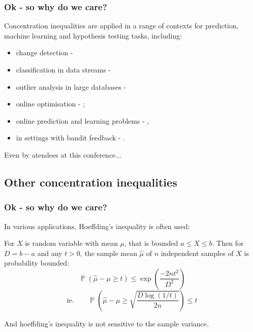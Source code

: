 \documentclass{beamer}
\DeclareMathOperator{\p}{\mathbb{P}}
\begin{document}
\begin{frame}
\frametitle{Ok - so why do we care?}
Concentration inequalities are applied in a range of contexts for prediction, machine learning and hypothesis testing tasks, including:\\

\begin{itemize}
\item change detection - \cite{KiferShaiGehrke2004,8000571}
\item classification in data streams - \cite{Zia-UrRehman2012}
\item outlier analysis in large databases - \cite{Aggarwal2015}
\item online optimisation - \cite{FlaxmanKalaiMcMahan2005,AgarwalDekelXiao2010}; 
\item online prediction and learning problems - \cite{Cesa-BianchiLugosi2006,%
Mnih:2008:EBS:1390156.1390241,DBLP:conf/aaai/ThomasTG15,Maurer50empiricalbernstein},
\item in settings with bandit feedback - \cite{AuerCesa-BianchiEtal_SIAM2003,AudibertBubeck_COLT2009,Tran-ThanhChapmanRJ_AAAI2009}.
\end{itemize}
Even by atendees at this conference...
\end{frame}



\subsection{Other concentration inequalities}

\begin{frame}
\frametitle{Ok - so why do we care?}
In various applications, Hoeffding's inequality is often used:
\begin{theorem}\label{hoeffdings_inequality}
For $X$ is random variable with mean $\mu$, that is bounded $a\le X\le b$. Then for $D=b-a$ and any $t>0$, the sample mean $\hat{\mu}$ of $n$ independent samples of $X$ is probability bounded:
$$\p(\hat{\mu}-\mu\ge t)\le \exp\left(\frac{-2nt^2}{D^2}\right)$$
$$\text{ie.}\quad\quad\p\left(\hat{\mu}-\mu\ge \sqrt{\frac{D\log(1/t)}{2n}}\right)\le t$$
\end{theorem}
And hoeffding's inequality is not sensitive to the sample variance.
\end{frame}
\end{document}
